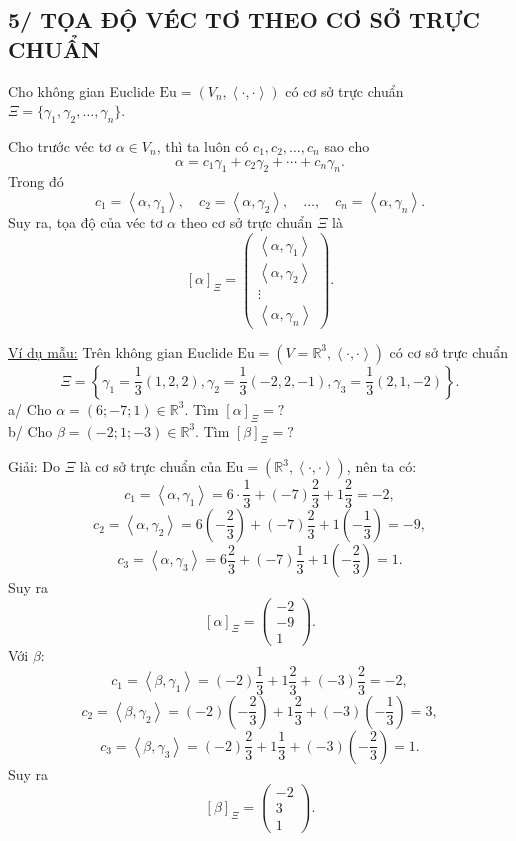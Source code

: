 \documentclass[12pt,a4paper]{article}
\newcommand{\R}{\mathbb{R}}
\newcommand{\Eu}{\mathrm{Eu}}
\newcommand{\ip}[2]{\left\langle #1,#2\right\rangle}
\begin{document}
\subsection*{5/ TỌA ĐỘ VÉC TƠ THEO CƠ SỞ TRỰC CHUẨN}
Cho không gian Euclide $\Eu=(V_n,\ip{\cdot}{\cdot})$ có cơ sở trực chuẩn $\Xi=\{\gamma_1,\gamma_2,\ldots,\gamma_n\}$.

Cho trước véc tơ $\alpha\in V_n$, thì ta luôn có $c_1,c_2,\ldots,c_n$ sao cho
\[
\alpha=c_1\gamma_1+c_2\gamma_2+\cdots+c_n\gamma_n.
\]
Trong đó
\[
c_1=\ip{\alpha}{\gamma_1},\quad c_2=\ip{\alpha}{\gamma_2},\quad\ldots,\quad c_n=\ip{\alpha}{\gamma_n}.
\]
Suy ra, tọa độ của véc tơ $\alpha$ theo cơ sở trực chuẩn $\Xi$ là
\[
[\alpha]_{\Xi}=\begin{pmatrix}
\ip{\alpha}{\gamma_1}\\
\ip{\alpha}{\gamma_2}\\
\vdots\\
\ip{\alpha}{\gamma_n}
\end{pmatrix}.
\]

\underline{Ví dụ mẫu:} Trên không gian Euclide $\Eu=(V=\R^3,\ip{\cdot}{\cdot})$ có cơ sở trực chuẩn
\[
\Xi=\left\{\gamma_1=\frac13(1,2,2),\gamma_2=\frac13(-2,2,-1),\gamma_3=\frac13(2,1,-2)\right\}.
\]
a/ Cho $\alpha=(6;-7;1)\in\R^3$. Tìm $[\alpha]_{\Xi}=?$\\
b/ Cho $\beta=(-2;1;-3)\in\R^3$. Tìm $[\beta]_{\Xi}=?$

Giải: Do $\Xi$ là cơ sở trực chuẩn của $\Eu=(\R^3,\ip{\cdot}{\cdot})$, nên ta có:
\[
c_1=\ip{\alpha}{\gamma_1}=6\cdot\frac13+(-7)\frac23+1\frac23=-2,
\]
\[
c_2=\ip{\alpha}{\gamma_2}=6\left(-\frac23\right)+(-7)\frac23+1\left(-\frac13\right)=-9,
\]
\[
c_3=\ip{\alpha}{\gamma_3}=6\frac23+(-7)\frac13+1\left(-\frac23\right)=1.
\]
Suy ra
\[
[\alpha]_{\Xi}=\begin{pmatrix}-2\\-9\\1\end{pmatrix}.
\]
Với $\beta$:
\[
c_1=\ip{\beta}{\gamma_1}=(-2)\frac13+1\frac23+(-3)\frac23=-2,
\]
\[
c_2=\ip{\beta}{\gamma_2}=(-2)\left(-\frac23\right)+1\frac23+(-3)\left(-\frac13\right)=3,
\]
\[
c_3=\ip{\beta}{\gamma_3}=(-2)\frac23+1\frac13+(-3)\left(-\frac23\right)=1.
\]
Suy ra
\[
[\beta]_{\Xi}=\begin{pmatrix}-2\\3\\1\end{pmatrix}.
\]
\end{document}
